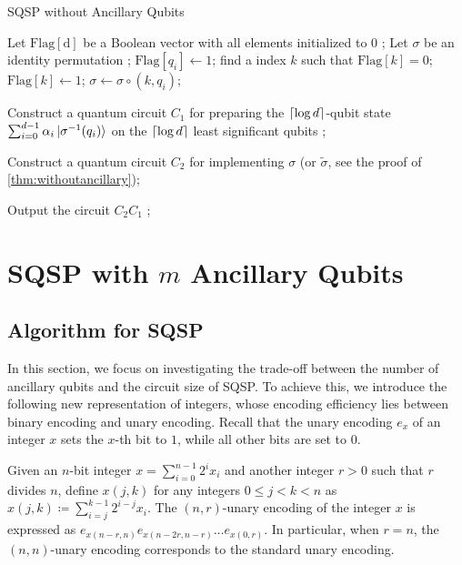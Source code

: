 \documentclass[a4paper,UKenglish,cleveref, autoref, thm-restate]{lipics-v2021}
\DeclarePairedDelimiter\rbra{\lparen}{\rparen}
\DeclarePairedDelimiter\cbra{\{}{\}}
\DeclarePairedDelimiter\ceil{\lceil}{\rceil}
\begin{document}
\begin{algorithm}[htbp]
\caption{SQSP without Ancillary Qubits}\label{alg:withoutancillary} 
\begin{algorithmic}[1]

    \STATE Let $\mathrm{Flag[d]}$ be a Boolean vector with all elements initialized to $0$ ;
    \STATE Let $\sigma$ be an identity permutation ;
    \STATE $\mathrm{Flag}[q_i] \xleftarrow{} 1$;
    \ENDIF
    \ENDFOR
    \STATE find a index $k$ such that $\mathrm{Flag}[k] = 0$;
    \STATE $\mathrm{Flag}[k] \xleftarrow{} 1$;
    $\sigma \xleftarrow{} \sigma \circ (k, q_i)$;
    \ENDIF
    \ENDFOR

    \STATE Construct a quantum circuit $C_1$ for preparing the $\ceil{\log d}$-qubit state $\sum_{i=0}^{d-1} \alpha_i \ket{\sigma^{-1}(q_i)}$ on the $\ceil{\log d}$ least significant qubits ;

    \STATE Construct a quantum circuit $C_2$ for implementing $\sigma$ (or $\widetilde{\sigma}$, see the proof of \cref{thm:withoutancillary});

    \STATE Output the circuit $C_2C_1$ ; 
\end{algorithmic}

\end{algorithm}

\section{\texorpdfstring{SQSP with $m$ Ancillary Qubits}{SQSP with m Ancillary Qubits}}\label{sec:with}

\subsection{Algorithm for SQSP}
In this section, we focus on investigating the trade-off between the number of ancillary qubits and the circuit size of SQSP. To achieve this, we introduce the following new representation of integers, whose encoding efficiency lies between binary encoding and unary encoding.
Recall that the unary encoding $e_x$ of an integer $x$ sets the $x$-th bit to $1$, while all other bits are set to $0$. 

\begin{definition}\label{def:nr}
Given an $n$-bit integer $x = \sum_{i=0}^{n-1}2^i x_i$ and another integer $r > 0$ such that $r$ divides $n$, define $x(j, k)$ for any integers $0 \leq j < k < n$ as $x(j, k) \coloneqq \sum_{i=j}^{k-1} 2^{i-j}x_i$. The $(n, r)$-unary encoding of the integer $x$ is expressed as $e_{x(n-r, n)} e_{x(n-2r, n-r)} \dots e_{x(0, r)}$. In particular, when $r = n$, the $(n, n)$-unary encoding corresponds to the standard unary encoding.
\end{definition}
\end{document}
